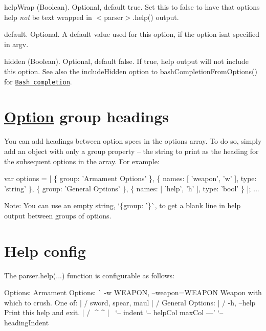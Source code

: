 \begin{DoxyItemize}
\item {\ttfamily help\+Wrap} (Boolean). Optional, default true. Set this to {\ttfamily false} to have that option\textquotesingle{}s {\ttfamily help} {\itshape not} be text wrapped in {\ttfamily $<$parser$>$.help()} output.
\item {\ttfamily default}. Optional. A default value used for this option, if the option isn\textquotesingle{}t specified in argv.
\item {\ttfamily hidden} (Boolean). Optional, default false. If true, help output will not include this option. See also the {\ttfamily include\+Hidden} option to {\ttfamily bash\+Completion\+From\+Options()} for \href{#bash-completion}{\tt Bash completion}.
\end{DoxyItemize}

\section*{\mbox{\hyperlink{structOption}{Option}} group headings}

You can add headings between option specs in the {\ttfamily options} array. To do so, simply add an object with only a {\ttfamily group} property -- the string to print as the heading for the subsequent options in the array. For example\+:


\begin{DoxyCode}
var options = [
    \{
        group: 'Armament Options'
    \},
    \{
        names: [ 'weapon', 'w' ],
        type: 'string'
    \},
    \{
        group: 'General Options'
    \},
    \{
        names: [ 'help', 'h' ],
        type: 'bool'
    \}
];
...
\end{DoxyCode}


Note\+: You can use an empty string, `\{group\+: '\textquotesingle{}\}\`{}, to get a blank line in help output between groups of options.

\section*{Help config}

The {\ttfamily parser.\+help(...)} function is configurable as follows\+: \begin{DoxyVerb}    Options:
      Armament Options:
    ^^  -w WEAPON, --weapon=WEAPON  Weapon with which to crush. One of: |
   /                                sword, spear, maul                  |
  /   General Options:                                                  |
 /      -h, --help                  Print this help and exit.           |
/   ^^^^                            ^                                   |
\       `-- indent                   `-- helpCol              maxCol ---'
 `-- headingIndent
\end{DoxyVerb}



